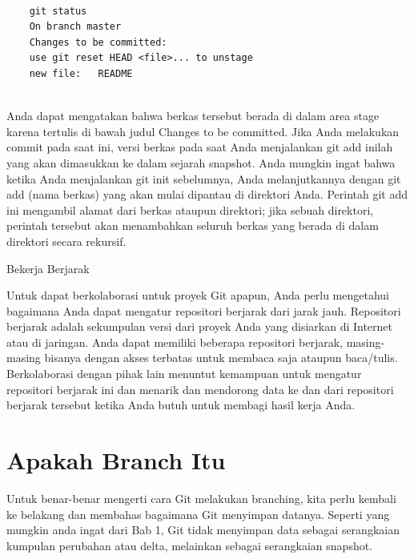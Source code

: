 {{{{{{{{\begin{verbatim}
	
	git status
	On branch master
	Changes to be committed:
	use git reset HEAD <file>... to unstage
	new file:   README
	
	\end{verbatim}
	
	\vspace{14pt}
	\noindent
	{\fontsize{14pt}{14pt}\selectfont
		
		
	Anda dapat mengatakan bahwa berkas tersebut berada di dalam area stage karena tertulis di bawah judul Changes to be committed. Jika Anda melakukan commit pada saat ini, versi berkas pada saat Anda menjalankan git add inilah yang akan dimasukkan ke dalam sejarah snapshot. Anda mungkin ingat bahwa ketika Anda menjalankan git init sebelumnya, Anda melanjutkannya dengan git add (nama berkas) yang akan mulai dipantau di direktori Anda. Perintah git add ini mengambil alamat dari berkas ataupun direktori; jika sebuah direktori, perintah tersebut akan menambahkan seluruh berkas yang berada di dalam direktori secara rekursif.
	
\vspace{14pt}
	\noindent
	{\fontsize{14pt}{14pt}\selectfont
	Bekerja Berjarak
	
	\vspace{14pt}
	\noindent
	{\fontsize{14pt}{14pt}\selectfont
	Untuk dapat berkolaborasi untuk proyek Git apapun, Anda perlu mengetahui bagaimana Anda dapat mengatur repositori berjarak dari jarak jauh. Repositori berjarak adalah sekumpulan versi dari proyek Anda yang disiarkan di Internet atau di jaringan. Anda dapat memiliki beberapa repositori berjarak, masing-masing bisanya dengan akses terbatas untuk membaca saja ataupun baca/tulis. Berkolaborasi dengan pihak lain menuntut kemampuan untuk mengatur repositori berjarak ini dan menarik dan mendorong data ke dan dari repositori berjarak tersebut ketika Anda butuh untuk membagi hasil kerja Anda.
	
	\vspace{14pt}
	\noindent
	{\fontsize{14pt}{14pt}\section
	{Apakah Branch Itu}
	\vspace{14pt}
	\noindent
	{\fontsize{14pt}{14pt}\selectfont
	Untuk benar-benar mengerti cara Git melakukan branching, kita perlu kembali ke belakang dan membahas bagaimana Git menyimpan datanya. Seperti yang mungkin anda ingat dari Bab 1, Git tidak menyimpan data sebagai serangkaian kumpulan perubahan atau delta, melainkan sebagai serangkaian snapshot.
	
}}}}}}}}}}}}}
